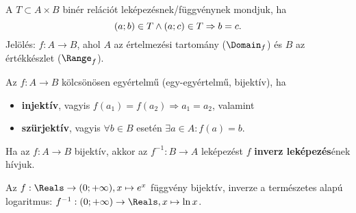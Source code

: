 \begin{definition}[Függvény]
  A $T \subset A \times B$ binér relációt leképezésnek/függvénynek mondjuk, ha
  \[
    (a; b) \in T \land (a; c)\in T \Rightarrow b = c
    \text.
  \]
  Jelölés: $f: A \rightarrow B$, ahol $A$ az értelmezési tartomány ($\Domain_f$)
  és $B$ az értékkészlet ($\Range_f$).
\end{definition}

\begin{definition}[Bijekció]
  Az $f : A \rightarrow B$ kölcsönösen egyértelmű (egy-egyértelmű, bijektív), ha
  \begin{itemize}
    \item \textbf{injektív}, vagyis $f(a_1) = f(a_2) \Rightarrow a_1 = a_2$,
          valamint
    \item \textbf{szürjektív}, vagyis $\forall b \in B$ esetén $\exists a \in A:
            f(a) = b$.
  \end{itemize}
\end{definition}

\begin{note}
  Ha az $f: A \rightarrow B$ bijektív, akkor az $f^{-1}: B \rightarrow A$
  leképezést $f$ \textbf{inverz leképezés}ének hívjuk.
\end{note}

\begin{example}
  Az $f: \Reals \rightarrow (0; +\infty), x \mapsto e^x$ függvény bijektív,
  inverze a természetes alapú logaritmus: $f^{-1}: (0; +\infty) \rightarrow
    \Reals, x \mapsto \ln x$.

  \begin{center}
  \end{center}
\end{example}

